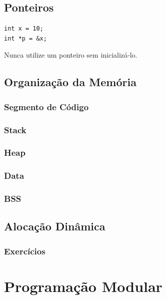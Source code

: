 \documentclass[12pt,a4paper,oneside]{extreport}
\begin{document}
\chapter{Ponteiros}

\begin{lstlisting}
int x = 10;
int *p = &x;
\end{lstlisting}


\begin{tcolorbox}[title=Importante]

Nunca utilize um ponteiro sem inicializá-lo.

\end{tcolorbox}


\chapter{Organização da Memória}

\section{Segmento de Código}

\section{Stack}

\section{Heap}

\section{Data}

\section{BSS}


\chapter{Alocação Dinâmica}

\section*{Exercícios}



\part{Programação Modular}
\end{document}
